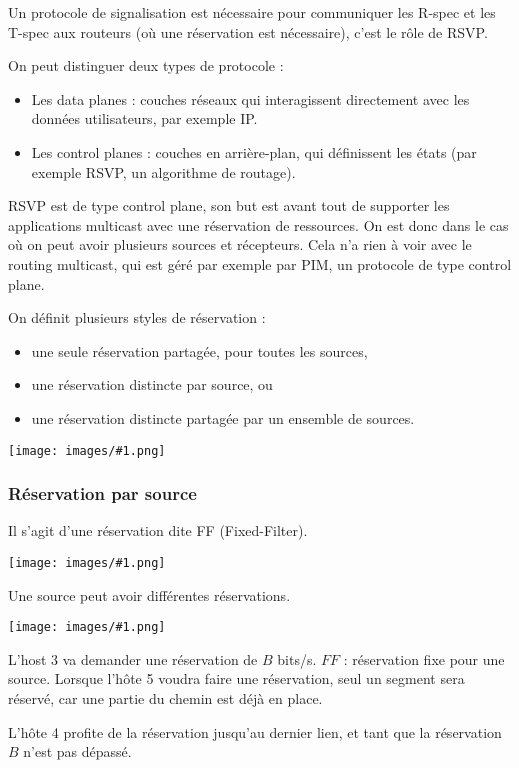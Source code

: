 \documentclass[10pt,a4paper]{report}
\newcommand{\dessin}[1]{\begin{center}\texttt{[image: images/\#1.png]}\end{center}}
\begin{document}
		Un protocole de signalisation est nécessaire pour communiquer les R-spec et les T-spec aux routeurs (où une réservation est nécessaire), c'est le rôle de RSVP.
		
		On peut distinguer deux types de protocole :
		
		\begin{itemize}
			\item Les data planes : couches réseaux qui interagissent directement avec les données utilisateurs, par exemple IP.
			\item Les control planes : couches en arrière-plan, qui définissent les états (par exemple RSVP, un algorithme de routage).
		\end{itemize}
		
		RSVP est de type control plane, son but est avant tout de supporter les applications multicast avec une réservation de ressources. On est donc dans le cas où on peut avoir plusieurs sources et récepteurs. Cela n'a rien à voir avec le routing multicast, qui est géré par exemple par PIM, un protocole de type control plane.
		
		On définit plusieurs styles de réservation :
		
		\begin{itemize}
			\item une seule réservation partagée, pour toutes les sources,
			\item une réservation distincte par source, ou
			\item une réservation distincte partagée par un ensemble de sources.
		\end{itemize}
			
			\dessin{121}
			
			\subsubsection{Réservation par source}
			
			Il s'agit d'une réservation dite FF (Fixed-Filter).
			
			\dessin{124}
			
			Une source peut avoir différentes réservations.
			
			\dessin{122}
			
			L'host 3 va demander une réservation de $B$ bits/s. $FF$ : réservation fixe pour une source. Lorsque l'hôte 5 voudra faire une réservation, seul un segment sera réservé, car une partie du chemin est déjà en place.
			
			L'hôte 4 profite de la réservation jusqu'au dernier lien, et tant que la réservation $B$ n'est pas dépassé.
			
\end{document}
